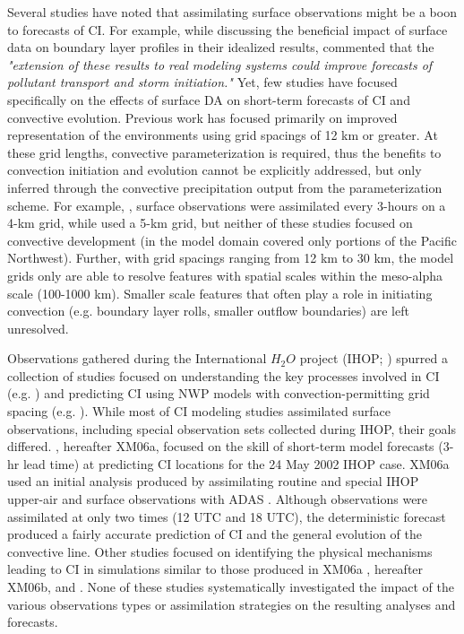 Several studies have noted that assimilating surface observations might be a boon to forecasts of CI. For example, while discussing the beneficial impact of surface data on boundary layer profiles in their idealized results, \citet{hackersnyder05} commented that the {\it "extension of these results to real modeling systems could improve forecasts of pollutant transport and storm initiation."} Yet, few studies have focused specifically on the effects of surface DA on short-term forecasts of CI and convective evolution. Previous work has focused primarily on improved representation of the environments using grid spacings of 12 km or greater. At these grid lengths, convective parameterization is required, thus the benefits to convection initiation and evolution cannot be explicitly addressed, but only inferred through the convective precipitation output from the parameterization scheme. For example, \citet{ancell12}, surface observations were assimilated every 3-hours on a 4-km grid, while \citet{knopfmeierstensrud13} used a 5-km grid, but neither of these studies focused on convective development (in \citealt{ancell12} the model domain covered only portions of the Pacific Northwest). Further, with grid spacings ranging from 12 km to 30 km, the model grids only are able to resolve features with spatial scales within the meso-alpha scale (100-1000 km). Smaller scale features that often play a role in initiating convection (e.g. boundary layer rolls, smaller outflow boundaries) are left unresolved.

Observations gathered during the International \(H_2O\) project (IHOP; \citealt{weckwerthetal04}) spurred a collection of studies focused on understanding the key processes involved in CI (e.g. \citealt{weckwerthparsons06}) and predicting CI using NWP models with convection-permitting grid spacing (e.g. \cite{xuemartin06a,xuemartin06b}). While most of CI modeling studies assimilated surface observations, including special observation sets collected during IHOP, their goals differed. \citet{xuemartin06a}, hereafter XM06a, focused on the skill of short-term model forecasts (3-hr lead time) at predicting CI locations for the 24 May 2002 IHOP case. XM06a used an initial analysis produced by assimilating routine and special IHOP upper-air and surface observations with ADAS \citep{brewster96}. Although observations were assimilated at only two times (12 UTC and 18 UTC), the deterministic forecast produced a fairly accurate prediction of CI and the general evolution of the convective line. Other studies focused on identifying the physical mechanisms leading to CI in simulations similar to those produced in XM06a \citep{xuemartin06b}, hereafter XM06b, and \citet{wangxue12}. None of these studies systematically investigated the impact of the various observations types or assimilation strategies on the resulting analyses and forecasts. 


